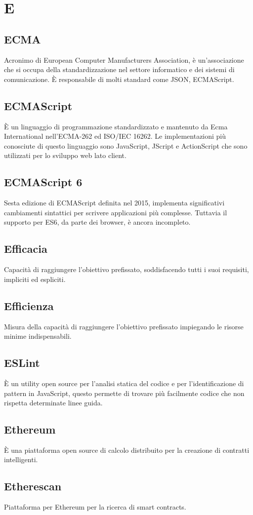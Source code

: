 \section*{E}

\subsection{ECMA}
Acronimo di European Computer Manufacturers Association, è un'associazione che si occupa della standardizzazione nel settore informatico e dei sistemi di comunicazione. È responsabile di molti standard come JSON, ECMAScript.

\subsection{ECMAScript}
È un linguaggio di programmazione standardizzato e mantenuto da Ecma International nell'ECMA-262 ed ISO/IEC 16262. Le implementazioni più conosciute di questo linguaggio sono JavaScript, JScript e ActionScript che sono utilizzati per lo sviluppo web lato client.

\subsection{ECMAScript 6}
Sesta edizione di ECMAScript definita nel 2015, implementa significativi cambiamenti sintattici per scrivere applicazioni più complesse. Tuttavia il supporto per ES6, da parte dei browser, è ancora incompleto.

\subsection{Efficacia}
Capacità di raggiungere l'obiettivo prefissato, soddisfacendo tutti i suoi requisiti, impliciti ed espliciti.

\subsection{Efficienza}
Misura della capacità di raggiungere l'obiettivo prefissato impiegando le risorse minime indispensabili.

\subsection{ESLint}
È un utility open source per l’analisi statica del codice e per l’identificazione di pattern in JavaScript,  questo permette di trovare più facilmente codice che non rispetta determinate linee guida.

\subsection{Ethereum}
È una piattaforma open source di calcolo distribuito per la creazione di contratti intelligenti.

\subsection{Etherescan}
Piattaforma per Ethereum per la ricerca di smart contracts.